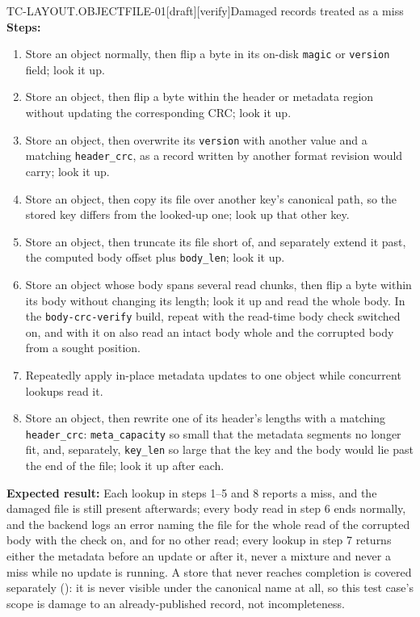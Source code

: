 \begin{requirement}{TC-LAYOUT.OBJECTFILE-01}[draft][verify]{Damaged records treated as a miss}
  \textbf{Steps:}
  \begin{enumerate}
    \item Store an object normally, then flip a byte in its on-disk
      \texttt{magic} or \texttt{version} field; look it up.
    \item Store an object, then flip a byte within the header or metadata
      region without updating the corresponding CRC; look it up.
    \item Store an object, then overwrite its \texttt{version} with another
      value and a matching \texttt{header\_crc}, as a record written by
      another format revision would carry; look it up.
    \item Store an object, then copy its file over another key's canonical
      path, so the stored key differs from the looked-up one; look up that
      other key.
    \item Store an object, then truncate its file short of, and separately
      extend it past, the computed body offset plus \texttt{body\_len}; look
      it up.
    \item Store an object whose body spans several read chunks, then flip a
      byte within its body without changing its length; look it up and read
      the whole body. In the \texttt{body-crc-verify} build, repeat with the
      read-time body check switched on, and with it on also read an intact
      body whole and the corrupted body from a sought position.
    \item Repeatedly apply in-place metadata updates to one object while
      concurrent lookups read it.
    \item Store an object, then rewrite one of its header's lengths with a
      matching \texttt{header\_crc}: \texttt{meta\_capacity} so small that
      the metadata segments no longer fit, and, separately,
      \texttt{key\_len} so large that the key and the body would lie past
      the end of the file; look it up after each.
  \end{enumerate}

  \textbf{Expected result:} Each lookup in steps 1--5 and 8 reports a miss, and the
  damaged file is still present afterwards; every body read in step 6 ends
  normally, and the backend logs an error naming the file for the whole read
  of the corrupted body with the check on, and for no other read; every
  lookup in step 7 returns
  either the metadata before an update or after it, never a mixture and never
  a miss while no update is running. A store that never
  reaches completion is covered separately
  (): it is never visible under the
  canonical name at all, so this test case's scope is damage to an
  already-published record, not incompleteness.


\end{requirement}
